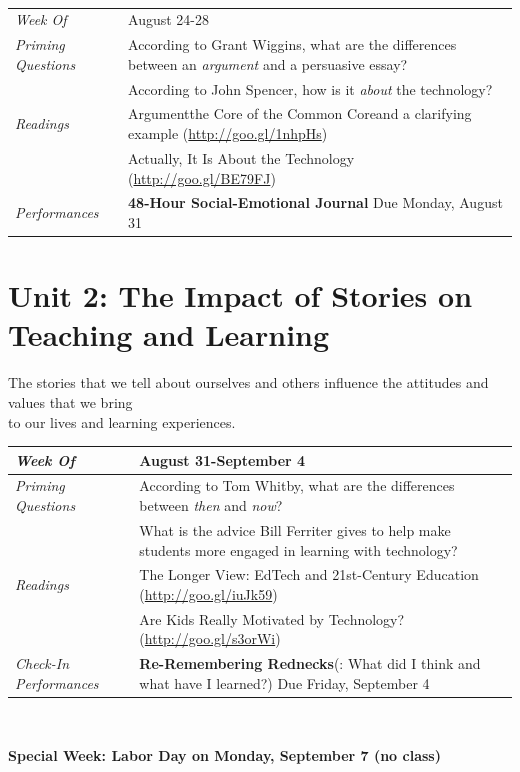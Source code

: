 \documentclass{tufte-handout}
\newcommand{\gentopic}[1]{\begin{fullwidth}\begin{center}\faKey \textsf{#1}\end{center}\end{fullwidth}}
\newcommand{\tabpq}{\faQuestionSign\medspace\textit{Priming Questions}}
\newcommand{\tabread}{\faBook\medspace\textit{Readings}}
\newcommand{\tabperformance}{\faTasks\medspace\textit{Performances}}
\newcommand{\tabdt}{\faCalendar\medspace\textit{Week Of}}
\newcommand{\tabcheckin}{\faPagelines\medspace\textit{Check-In Performances}}
\newcommand{\tabbreak}{\begin{fullwidth}\begin{center}\faAsterisk\faAsterisk\faAsterisk\\\end{center}\end{fullwidth}}
\newcommand{\specialweek}[1]{\begin{fullwidth}\begin{center}\textbf{\faBullhorn\medspace Special Week: #1 \medspace\faBullhorn}\end{center}\end{fullwidth}}
\newenvironment{tabsched}
	{\small
	\begin{tabular}{p{1.5in}p{4.5in}}
	\midrule}
	{\midrule
	\end{tabular}
	\normalsize}
\newcommand{\weektwo}{August 24-28}
\newcommand{\weekthree}{August 31-September 4}
\newcommand{\laborday}{Labor Day on Monday, September 7 (no class)}
\begin{document}
\tabbreak

\begin{tabsched}
	\tabdt & \weektwo \\
	\midure
	\tabpq & According to Grant Wiggins, what are the differences between an \emph{argument} and a persuasive essay? \\
	& According to John Spencer, how is it \emph{about} the technology? \\
	\midrule
	\tabread & Argument\textemdash{}the Core of the Common Core\textemdash{}and a clarifying example (\url{http://goo.gl/1nhpHs}) \\
	& Actually, It Is About the Technology (\url{http://goo.gl/BE79FJ}) \\
	\midrule
	\tabperformance & \textbf{48-Hour Social-Emotional Journal} Due Monday, August 31 \\
\end{tabsched}

	\section{Unit 2: The Impact of Stories on Teaching and Learning}

\gentopic{The stories that we tell about ourselves and others influence the attitudes and values that we bring\\to our lives and learning experiences.}

\begin{tabsched}
	\tabdt & \weekthree \\
	\midrule
	\tabpq & According to Tom Whitby, what are the differences between \textit{then} and \textit{now}? \\
	& What is the advice Bill Ferriter gives to help make students more engaged in learning with technology? \\
	\midrule
	\tabread & The Longer View: EdTech and 21st-Century Education (\url{http://goo.gl/iuJk59}) \\
	& Are Kids Really Motivated by Technology? (\url{http://goo.gl/s3orWi}) \\
	\midrule
	\tabcheckin & \textbf{Re-Remembering Rednecks}(: What did I think and what have I learned?) Due Friday, September 4 \\
\end{tabsched}

\tabbreak

\specialweek{\laborday}
\end{document}
